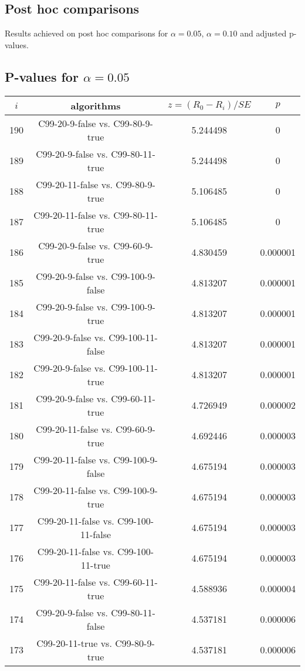 \documentclass[a4paper,10pt]{article}
\begin{document}
\begin{landscape}
\pagebreak

\section{Post hoc comparisons}

Results achieved on post hoc comparisons for $\alpha = 0.05$, $\alpha = 0.10$ and adjusted p-values.

\subsection{P-values for $\alpha=0.05$}

\begin{table}[!htp]
\centering\scriptsize
\begin{tabular}{cccc}
$i$&algorithms&$z=(R_0 - R_i)/SE$&$p$\\
\hline190&C99-20-9-false vs. C99-80-9-true&5.244498&0\\
189&C99-20-9-false vs. C99-80-11-true&5.244498&0\\
188&C99-20-11-false vs. C99-80-9-true&5.106485&0\\
187&C99-20-11-false vs. C99-80-11-true&5.106485&0\\
186&C99-20-9-false vs. C99-60-9-true&4.830459&0.000001\\
185&C99-20-9-false vs. C99-100-9-false&4.813207&0.000001\\
184&C99-20-9-false vs. C99-100-9-true&4.813207&0.000001\\
183&C99-20-9-false vs. C99-100-11-false&4.813207&0.000001\\
182&C99-20-9-false vs. C99-100-11-true&4.813207&0.000001\\
181&C99-20-9-false vs. C99-60-11-true&4.726949&0.000002\\
180&C99-20-11-false vs. C99-60-9-true&4.692446&0.000003\\
179&C99-20-11-false vs. C99-100-9-false&4.675194&0.000003\\
178&C99-20-11-false vs. C99-100-9-true&4.675194&0.000003\\
177&C99-20-11-false vs. C99-100-11-false&4.675194&0.000003\\
176&C99-20-11-false vs. C99-100-11-true&4.675194&0.000003\\
175&C99-20-11-false vs. C99-60-11-true&4.588936&0.000004\\
174&C99-20-9-false vs. C99-80-11-false&4.537181&0.000006\\
173&C99-20-11-true vs. C99-80-9-true&4.537181&0.000006\\

\end{tabular}
\end{table}
\end{landscape}
\end{document}

